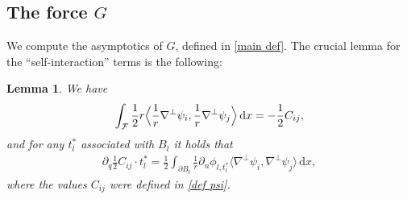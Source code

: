 \documentclass[JEP,XML,SOM,Unicode,published]{cedram}
\newtheorem{lemma}[theorem]{Lemma}
\theoremstyle{definition}
\newcommand\bscalar[2]{\bigl\langle #1,#2\bigr\rangle}
\newcommand\Bscalar[2]{\Bigl\langle #1,#2\Bigr\rangle}
\newcommand\eq{=}
\newcommand\dd{\,\mathrm{d}}
\newcommand\dx{\dd x}
\let\de\partial
\begin{document}
\subsection{The force $G$}
We compute the asymptotics of $G$, defined in \ref{main def}. The crucial lemma for the ``self-interaction'' terms is the following:

\begin{lemma}\label{Lem:EnergyDerivative}
We have
\begin{align*}
\int_{\mathcal{F}} \frac{1}{2}r\Bscalar{\frac{1}{r}\nabla^\perp\psi_i}{\frac{1}{r}\nabla^\perp\psi_j}\dx\eq-\frac{1}{2}C_{ij},
\end{align*}
and for any $t_l^*$ associated with $B_l$ it holds that
\begin{align*}
\de_{q}\frac{1}{2}C_{ij}\cdot t_l^*\eq\frac{1}{2}\int_{\de B_l}\frac{1}{r}\de_n\phi_{l,t_l^*}\bscalar{\nabla^\perp\psi_i}{\nabla^\perp\psi_j}\dx,
\end{align*}
where the values $C_{ij}$ were defined in \ref{def psi}.
\end{lemma}
\end{document}
